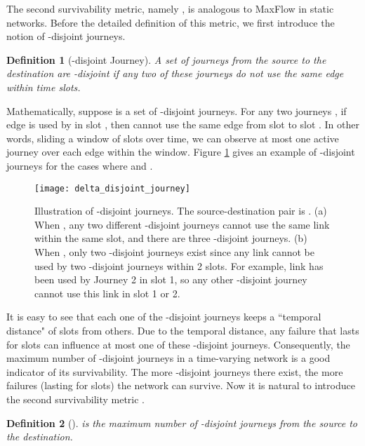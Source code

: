 \documentclass[10pt, conference, letterpaper]{IEEEtran}
\newtheorem{definition}{Definition}
\begin{document}
The second survivability metric, namely , is analogous to MaxFlow in static networks. Before the detailed definition of this metric, we first introduce the notion of -disjoint journeys.

\begin{definition}[{-disjoint Journey}]
A set of journeys from the source to the destination are -disjoint if any two of these journeys do not use the same edge within  time slots.
\end{definition}

\noindent Mathematically, suppose  is a set of -disjoint journeys. For any two journeys , if edge  is used by  in slot , then  cannot use the same edge  from slot  to slot . In other words, sliding a window of  slots over time, we can observe at most one active journey over each edge within the window. Figure \ref{disjoint_example} gives an example of -disjoint journeys for the cases where  and . 

\begin{figure}[ht]
\begin{center}
\texttt{[image: delta\_disjoint\_journey]}
\caption{Illustration of -disjoint journeys. The source-destination pair is . (a) When , any two different -disjoint journeys cannot use the same link within the same slot, and there are three -disjoint journeys. (b) When , only two -disjoint journeys exist since any link cannot be used by two -disjoint journeys within 2 slots. For example, link  has been used by Journey 2 in slot 1, so any other -disjoint journey cannot use this link in slot 1 or 2.}
\label{disjoint_example}\vspace{-3mm}
\end{center}
\end{figure}

It is easy to see that each one of the -disjoint journeys keeps a ``temporal distance" of  slots from others. Due to the temporal distance, any failure that lasts for  slots can influence at most one of these -disjoint journeys. Consequently, the maximum number of -disjoint journeys in a time-varying network is a good indicator of its survivability. The more -disjoint journeys there exist, the more failures (lasting for  slots) the network can survive. Now it is natural to introduce the second survivability metric .

\begin{definition}[{}]
 is the maximum number of -disjoint journeys from the source to the destination.
\end{definition}
\end{document}
